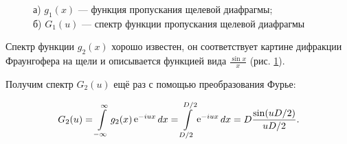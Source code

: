 \documentclass[a5paper,10pt, twoside]{article} %
\begin{document}
		\begin{figure}[h]
			\begin{minipage}[h]{0.4\linewidth}
			\end{minipage}
			\hfill
			\begin{minipage}[h]{0.6\linewidth}
			\end{minipage}
			\caption
			{
				а) $g_1 (x)$ — функция пропускания щелевой диафрагмы; \\
				б) $G_1 (u)$ — спектр функции пропускания щелевой диафрагмы
			}
			\label{ris:dia}
		\end{figure}
		
		
		Спектр функции $g_2(x)$ хорошо известен, он соответствует картине дифракции Фраунгофера на щели и описывается функцией вида $\frac{\sin x}{x}$ (рис. \ref{ris:dia}).
		
		Получим спектр $G_2(u)$ ещё раз с помощью преобразования Фурье:
		
		\begin{displaymath}
			G_2(u) = \int\limits_{-\infty}^{\infty} g_2(x) \mathop{\mathrm e}\nolimits^{-iux} dx = \int\limits_{D / 2}^{D / 2} \mathop{\mathrm e}\nolimits^{-iux} dx = D \frac{\sin (uD / 2)}{uD / 2}.
		\end{displaymath}
		
\end{document}
